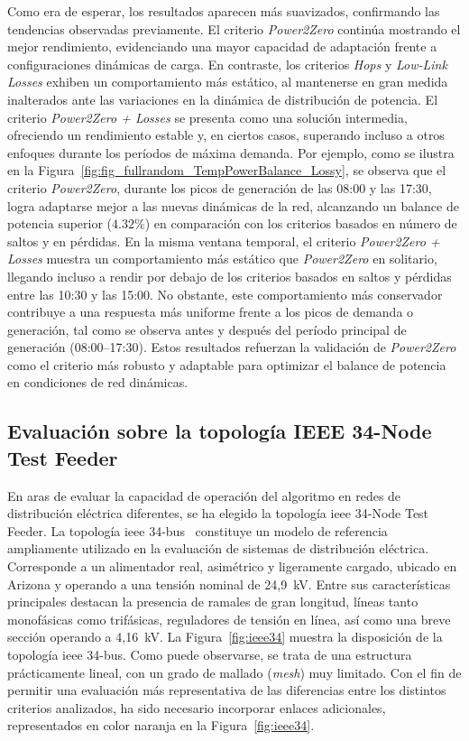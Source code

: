 Como era de esperar, los resultados aparecen más suavizados, confirmando las tendencias observadas previamente. El criterio \textit{Power2Zero} continúa mostrando el mejor rendimiento, evidenciando una mayor capacidad de adaptación frente a configuraciones dinámicas de carga. En contraste, los criterios \textit{Hops} y \textit{Low-Link Losses} exhiben un comportamiento más estático, al mantenerse en gran medida inalterados ante las variaciones en la dinámica de distribución de potencia. El criterio \textit{Power2Zero + Losses} se presenta como una solución intermedia, ofreciendo un rendimiento estable y, en ciertos casos, superando incluso a otros enfoques durante los períodos de máxima demanda. Por ejemplo, como se ilustra en la Figura~\ref{fig:fig_fullrandom_TempPowerBalance_Lossy}, se observa que el criterio \textit{Power2Zero}, durante los picos de generación de las 08:00 y las 17:30, logra adaptarse mejor a las nuevas dinámicas de la red, alcanzando un balance de potencia superior ($4.32\%$) en comparación con los criterios basados en número de saltos y en pérdidas. En la misma ventana temporal, el criterio \textit{Power2Zero + Losses} muestra un comportamiento más estático que \textit{Power2Zero} en solitario, llegando incluso a rendir por debajo de los criterios basados en saltos y pérdidas entre las 10:30 y las 15:00. No obstante, este comportamiento más conservador contribuye a una respuesta más uniforme frente a los picos de demanda o generación, tal como se observa antes y después del período principal de generación (08:00–17:30). Estos resultados refuerzan la validación de \textit{Power2Zero} como el criterio más robusto y adaptable para optimizar el balance de potencia en condiciones de red dinámicas.

\subsection{Evaluación sobre la topología IEEE 34-Node Test Feeder}

En aras de evaluar la capacidad de operación del algoritmo en redes de distribución eléctrica diferentes, se ha elegido la topología \gls{ieee} 34-Node Test Feeder. La topología \gls{ieee} 34-bus~\cite{Schneider17} constituye un modelo de referencia ampliamente utilizado en la evaluación de sistemas de distribución eléctrica. Corresponde a un alimentador real, asimétrico y ligeramente cargado, ubicado en Arizona y operando a una tensión nominal de 24,9~kV. Entre sus características principales destacan la presencia de ramales de gran longitud, líneas tanto monofásicas como trifásicas, reguladores de tensión en línea, así como una breve sección operando a 4,16~kV. La Figura~\ref{fig:ieee34} muestra la disposición de la topología \gls{ieee} 34-bus. Como puede observarse, se trata de una estructura prácticamente lineal, con un grado de mallado (\textit{mesh}) muy limitado. Con el fin de permitir una evaluación más representativa de las diferencias entre los distintos criterios analizados, ha sido necesario incorporar enlaces adicionales, representados en color naranja en la Figura~\ref{fig:ieee34}.


